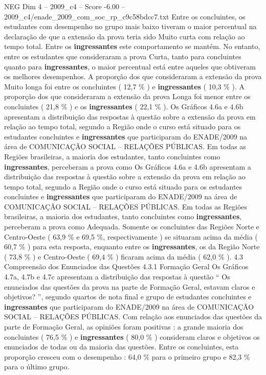\begin{textsample}{NEG Dim 4 – 2009\_c4 – Score -6.00 – 2009\_c4/enade\_2009\_com\_soc\_rp\_c9c58bdcc7.txt}
Entre os concluintes, os estudantes com desempenho no grupo mais baixo tiveram o maior percentual na declaração de que a extensão da prova teria sido Muito curta com relação ao tempo total.
Entre os \textbf{ingressantes} este comportamento se mantém.
No entanto, entre os estudantes que consideraram a prova Curta, tanto para concluintes quanto para \textbf{ingressantes}, o maior percentual está entre aqueles que obtiveram os melhores desempenhos.
A proporção dos que consideraram a extensão da prova Muito longa foi entre os concluintes ( 12,7 \% ) e \textbf{ingressantes} ( 10,3 \% ).
A proporção dos que consideraram a extensão da prova Longa foi menor entre os concluintes ( 21,8 \% ) e os \textbf{ingressantes} ( 22,1 \% ).
Os Gráficos 4.6a e 4.6b apresentam a distribuição das respostas à questão sobre a extensão da prova em relação ao tempo total, segundo a Região onde o curso está situado para os estudantes concluintes e \textbf{ingressantes} que participaram do ENADE/2009 na área de COMUNICAÇÃO SOCIAL – RELAÇÕES PÚBLICAS.
Em todas as Regiões brasileiras, a maioria dos estudantes, tanto concluintes como \textbf{ingressantes}, perceberam a prova como Os Gráficos 4.6a e 4.6b apresentam a distribuição das respostas à questão sobre a extensão da prova em relação ao tempo total, segundo a Região onde o curso está situado para os estudantes concluintes e \textbf{ingressantes} que participaram do ENADE/2009 na área de COMUNICAÇÃO SOCIAL – RELAÇÕES PÚBLICAS.
Em todas as Regiões brasileiras, a maioria dos estudantes, tanto concluintes como \textbf{ingressantes}, perceberam a prova como Adequada.
Somente os concluintes das Regiões Norte e Centro-Oeste ( 63,9 \% e 69,5 \%, respectivamente ) se situaram acima da média ( 60,7 \% ) para esta resposta, enquanto entre os \textbf{ingressantes}, os da Região Norte ( 73,8 \% ) e Centro-Oeste ( 69,4 \% ) ficaram acima da média ( 62,0 \% ). 4.3 Compreensão dos Enunciados das Questões 4.3.1 Formação Geral Os Gráficos 4.7a, 4.7b e 4.7c apresentam a distribuição das respostas à questão “ Os enunciados das questões da prova na parte de Formação Geral, estavam claros e objetivos? ”, segundo quartos de nota final e grupo de estudantes concluintes e \textbf{ingressantes} que participaram do ENADE/2009 na área de COMUNICAÇÃO SOCIAL – RELAÇÕES PÚBLICAS.
Com relação aos enunciados das questões da parte de Formação Geral, as opiniões foram positivas : a grande maioria dos concluintes ( 76,5 \% ) e \textbf{ingressantes} ( 80,0 \% ) consideram claros e objetivos os enunciados de todas ou da maioria das questões.
Entre os concluintes, esta proporção cresceu com o desempenho : 64,0 \% para o primeiro grupo e 82,3 \% para o último grupo.

\end{textsample}
